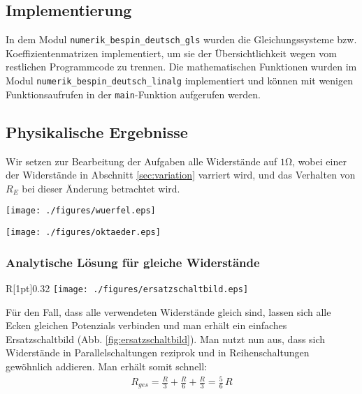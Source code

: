 \documentclass[10pt,a4paper]{article}
\begin{document}
\subsection{Implementierung}
In dem Modul \texttt{numerik\_bespin\_deutsch\_gls} wurden die Gleichungssysteme bzw. Koeffizientenmatrizen implementiert, um sie der Übersichtlichkeit wegen vom restlichen Programmcode zu trennen. Die mathematischen Funktionen wurden im Modul \texttt{numerik\_bespin\_deutsch\_linalg} implementiert und können mit wenigen Funktionsaufrufen in der \texttt{main}-Funktion aufgerufen werden.

\subsection{Physikalische Ergebnisse}

Wir setzen zur Bearbeitung der Aufgaben alle Widerstände auf $1$\si{\ohm}, wobei einer der Widerstände in Abschnitt \ref{sec:variation} varriert wird, und das Verhalten von $R_E$ bei dieser Änderung betrachtet wird.

\vspace{8pt}
\begin{minipage}[c]{0.47\textwidth}
\captionsetup{type=figure}
\begin{center}
\texttt{[image: ./figures/wuerfel.eps]}
\vspace{10pt}
\end{center}
\end{minipage}
\begin{minipage}[c]{0.47\textwidth}
\captionsetup{type=figure}
\begin{center}
\texttt{[image: ./figures/oktaeder.eps]}
\end{center}
\end{minipage}

\subsubsection{Analytische Lösung für gleiche Widerstände}
\label{auswertung}
\begin{wrapfigure}[12]{R}[1pt]{0.32\textwidth}
\centering
\texttt{[image: ./figures/ersatzschaltbild.eps]}
\caption{Schaltbild für gleiche Widerstände $R$}
\label{fig:ersatzschaltbild}
\end{wrapfigure}
Für den Fall, dass alle verwendeten Widerstände gleich sind, lassen sich alle Ecken gleichen Potenzials verbinden und man erhält ein einfaches Ersatzschaltbild (Abb. \ref{fig:ersatzschaltbild}). Man nutzt nun aus, dass sich Widerstände in Parallelschaltungen reziprok und in Reihenschaltungen gewöhnlich addieren. Man erhält somit schnell:
\begin{align}
R_{ges}=\frac{R}{3}+\frac{R}{6}+\frac{R}{3}=\frac{5}{6}\,R
\end{align}
\end{document}
